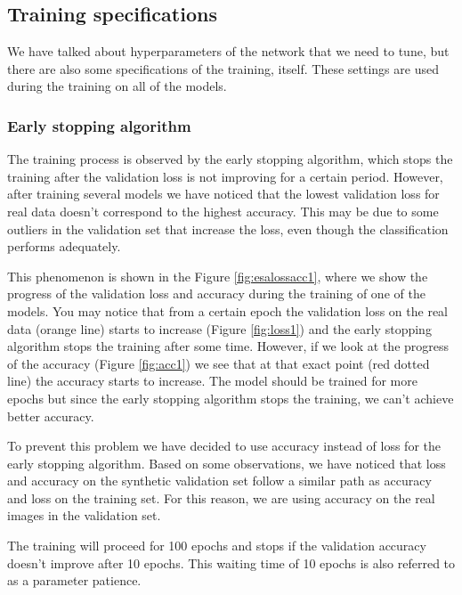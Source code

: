 \subsection{Training specifications}
We have talked about hyperparameters of the network that we need to tune, but there are also some specifications of the training, itself. These settings are used during the training on all of the models. 

\subsubsection{Early stopping algorithm}

The training process is observed by the early stopping algorithm, which stops the training after the validation loss is not improving for a certain period. However, after training several models we have noticed that the lowest validation loss for real data doesn't correspond to the highest accuracy. This may be due to some outliers in the validation set that increase the loss, even though the classification performs adequately. 

This phenomenon is shown in the Figure \ref{fig:esalossacc1}, where we show the progress of the validation loss and accuracy during the training of one of the models. You may notice that from a certain epoch the validation loss on the real data (orange line) starts to increase (Figure \ref{fig:loss1}) and the early stopping algorithm stops the training after some time. However, if we look at the progress of the accuracy (Figure \ref{fig:acc1}) we see that at that exact point (red dotted line) the accuracy starts to increase. The model should be trained for more epochs but since the early stopping algorithm stops the training, we can't achieve better accuracy. 

To prevent this problem we have decided to use accuracy instead of loss for the early stopping algorithm. Based on some observations, we have noticed that loss and accuracy on the synthetic validation set follow a similar path as accuracy and loss on the training set. For this reason, we are using accuracy on the real images in the validation set.  

The training will proceed for 100 epochs and stops if the validation accuracy doesn't improve after 10 epochs. This waiting time of 10 epochs is also referred to as a parameter patience. 

